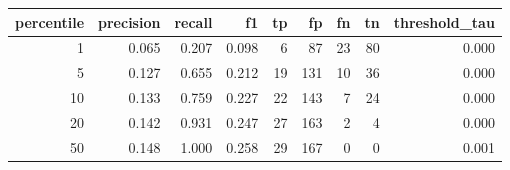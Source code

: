 \begin{tabular}{rrrrrrrrr}
\toprule
percentile & precision & recall & f1 & tp & fp & fn & tn & threshold\_tau \\
\midrule
1 & 0.065 & 0.207 & 0.098 & 6 & 87 & 23 & 80 & 0.000 \\
5 & 0.127 & 0.655 & 0.212 & 19 & 131 & 10 & 36 & 0.000 \\
10 & 0.133 & 0.759 & 0.227 & 22 & 143 & 7 & 24 & 0.000 \\
20 & 0.142 & 0.931 & 0.247 & 27 & 163 & 2 & 4 & 0.000 \\
50 & 0.148 & 1.000 & 0.258 & 29 & 167 & 0 & 0 & 0.001 \\
\bottomrule
\end{tabular}
